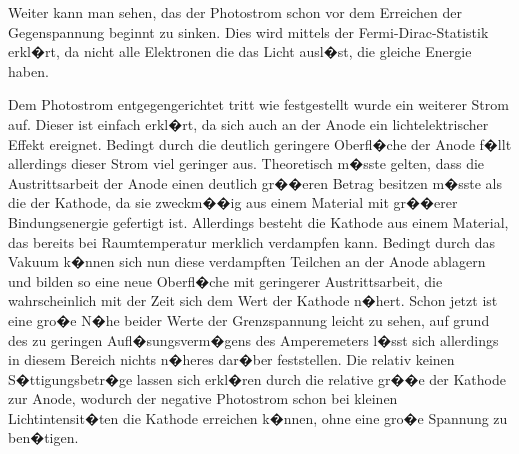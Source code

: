 \documentclass[a4paper, 10pt]{report}%
\begin{document}
Weiter kann man sehen, das der Photostrom schon vor dem Erreichen der Gegenspannung beginnt zu sinken. Dies wird mittels der Fermi-Dirac-Statistik erkl�rt, da nicht alle Elektronen die das Licht ausl�st, die gleiche Energie haben. 

Dem Photostrom entgegengerichtet tritt wie festgestellt wurde ein weiterer Strom auf. Dieser ist einfach erkl�rt, da sich auch an der Anode ein lichtelektrischer Effekt ereignet. Bedingt durch die deutlich geringere Oberfl�che der Anode f�llt allerdings dieser Strom viel geringer aus. Theoretisch m�sste gelten, dass die Austrittsarbeit der Anode einen deutlich gr��eren Betrag besitzen m�sste als die der Kathode, da sie zweckm��ig aus einem Material mit gr��erer Bindungsenergie gefertigt ist. Allerdings besteht die Kathode aus einem Material, das bereits bei Raumtemperatur merklich verdampfen kann. Bedingt durch das Vakuum k�nnen sich nun diese verdampften Teilchen an der Anode ablagern und bilden so eine neue Oberfl�che mit geringerer Austrittsarbeit, die wahrscheinlich mit der Zeit sich dem Wert der Kathode n�hert. Schon jetzt ist eine gro�e N�he beider Werte der Grenzspannung leicht zu sehen, auf grund des zu geringen Aufl�sungsverm�gens des Amperemeters l�sst sich allerdings in diesem Bereich nichts n�heres dar�ber feststellen. Die relativ keinen S�ttigungsbetr�ge lassen sich erkl�ren durch die relative gr��e der Kathode zur Anode, wodurch der negative Photostrom schon bei kleinen Lichtintensit�ten die Kathode erreichen k�nnen, ohne eine gro�e Spannung zu ben�tigen. 
\end{document}
